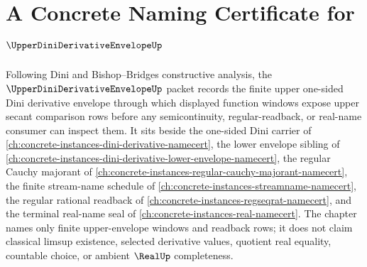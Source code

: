 \chapter{A Concrete Naming Certificate for $\UpperDiniDerivativeEnvelopeUp$}
\label{ch:concrete-instances-upper-dini-derivative-envelope-namecert}

Following Dini and Bishop--Bridges constructive analysis, the $\UpperDiniDerivativeEnvelopeUp$ packet records the finite upper one-sided Dini derivative envelope through which displayed function windows expose upper secant comparison rows before any semicontinuity, regular-readback, or real-name consumer can inspect them. It sits beside the one-sided Dini carrier of \autoref{ch:concrete-instances-dini-derivative-namecert}, the lower envelope sibling of \autoref{ch:concrete-instances-dini-derivative-lower-envelope-namecert}, the regular Cauchy majorant of \autoref{ch:concrete-instances-regular-cauchy-majorant-namecert}, the finite stream-name schedule of \autoref{ch:concrete-instances-streamname-namecert}, the regular rational readback of \autoref{ch:concrete-instances-regseqrat-namecert}, and the terminal real-name seal of \autoref{ch:concrete-instances-real-namecert}. The chapter names only finite upper-envelope windows and readback rows; it does not claim classical limsup existence, selected derivative values, quotient real equality, countable choice, or ambient $\RealUp$ completeness.

